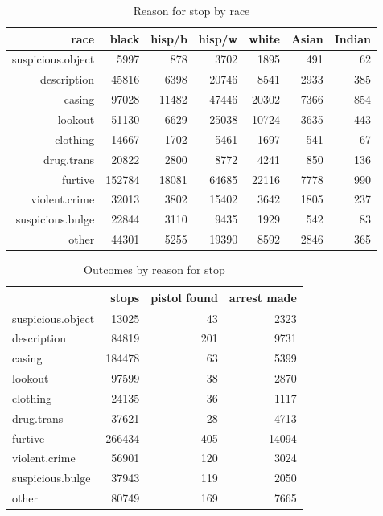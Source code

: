 \documentclass[letterpaper]{article}
\begin{document}
  \begin{table}[H]
    \centering
    \begin{tabular}{rrrrrrr}
      \toprule
      race              & black  & hisp/b & hisp/w & white & Asian & Indian \\
      \midrule
      suspicious.object & 5997   & 878    & 3702   & 1895  & 491   & 62 \\
      description       & 45816  & 6398   & 20746  & 8541  & 2933  & 385 \\
      casing            & 97028  & 11482  & 47446  & 20302 & 7366  & 854 \\
      lookout           & 51130  & 6629   & 25038  & 10724 & 3635  & 443 \\
      clothing          & 14667  & 1702   & 5461   & 1697  & 541   & 67 \\
      drug.trans        & 20822  & 2800   & 8772   & 4241  & 850   & 136 \\
      furtive           & 152784 & 18081  & 64685  & 22116 & 7778  & 990 \\
      violent.crime     & 32013  & 3802   & 15402  & 3642  & 1805  & 237 \\
      suspicious.bulge  & 22844  & 3110   & 9435   & 1929  & 542   & 83 \\
      other             & 44301  & 5255   & 19390  & 8592  & 2846  & 365 \\
      \bottomrule
    \end{tabular}
    \caption{Reason for stop by race}
  \end{table}

  \begin{table}[H]
    \centering
    \begin{tabular}{lrrr}
      \toprule
                          & stops  & pistol found & arrest made \\
      \midrule
      suspicious.object   & 13025  & 43           & 2323 \\
      description         & 84819  & 201          & 9731 \\
      casing              & 184478 & 63           & 5399 \\
      lookout             & 97599  & 38           & 2870 \\
      clothing            & 24135  & 36           & 1117 \\
      drug.trans          & 37621  & 28           & 4713 \\
      furtive             & 266434 & 405          & 14094 \\
      violent.crime       & 56901  & 120          & 3024 \\
      suspicious.bulge    & 37943  & 119          & 2050 \\
      other               & 80749  & 169          & 7665 \\
       \bottomrule
    \end{tabular}
    \caption{Outcomes by reason for stop}
  \end{table}
\end{document}
